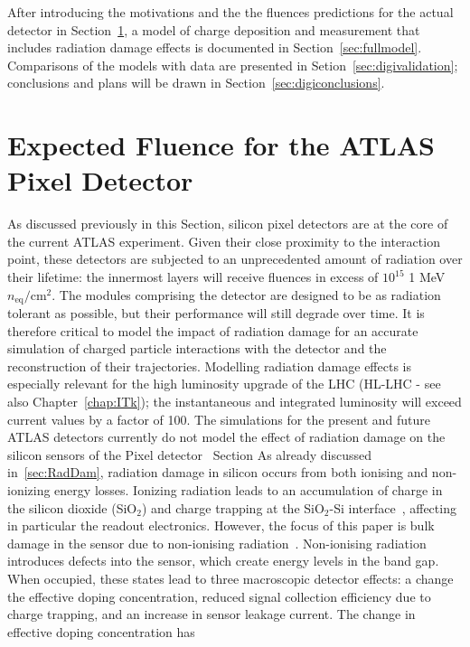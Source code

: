  
After introducing the motivations and the the fluences predictions for the actual detector in 
Section~\ref{sec:expflu}, a model of charge deposition and measurement that includes radiation 
damage effects is documented in Section~\ref{sec:fullmodel}. Comparisons of the models with data are 
presented in Setion~\ref{sec:digivalidation}; conclusions and plans will be drawn in Section~\ref{sec:digiconclusions}.


\section{Expected Fluence for the ATLAS Pixel Detector}
\label{sec:expflu}
As discussed previously in this Section, silicon pixel detectors are at 
the core of the current ATLAS  experiment.  Given their close proximity to the interaction point, these 
detectors are subjected to an 
unprecedented amount of radiation over their lifetime:  the innermost layers will receive 
fluences in excess of $10^{15}$ 1 MeV $n_\text{eq}/\text{cm}^2$. The modules comprising the detector are designed to be as radiation tolerant as possible, but their performance will still degrade over time.  It is therefore critical to model the impact of radiation damage for an accurate simulation of charged particle interactions with the detector and the reconstruction of their trajectories.  Modelling radiation damage effects is especially relevant for the high luminosity upgrade of the LHC (HL-LHC - see also Chapter~\ref{chap:ITk}); the instantaneous and integrated luminosity will exceed current values by a factor of 100.  The simulations for the present and future ATLAS detectors currently do not model the effect of radiation damage on the silicon sensors of the Pixel detector~\cite{Aad:2010ah,ATL-PHYS-PUB-2016-025}
Section
As already discussed in~\ref{sec:RadDam}, radiation damage in silicon occurs from both ionising and 
non-ionizing energy losses. Ionizing radiation leads to an accumulation of charge in the silicon dioxide 
(SiO$_2$) and charge trapping at the SiO$_2$-Si interface~\cite{Oldham}, affecting in particular the 
readout electronics. However, the focus of this paper is bulk damage in the sensor due to non-ionising 
radiation~\cite{moll-thesis}.   Non-ionising radiation introduces defects into the sensor, which create 
energy levels in the band gap.  When occupied, these states lead to three macroscopic detector effects: 
a change the effective doping concentration, reduced signal collection efficiency due to charge trapping, 
and an increase in sensor leakage current. The change in effective doping concentration has 
